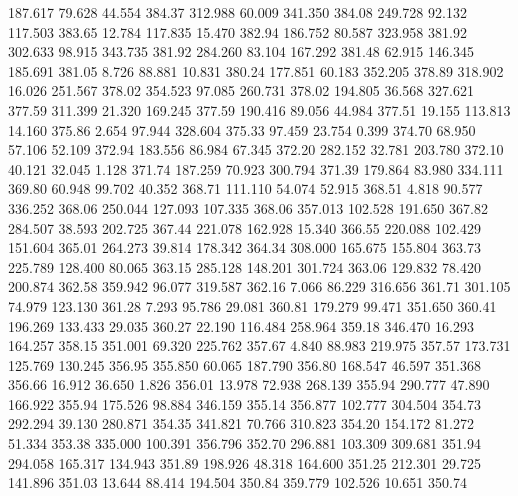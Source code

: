  187.617   79.628   44.554       384.37
 312.988   60.009  341.350       384.08
 249.728   92.132  117.503       383.65
  12.784  117.835   15.470       382.94
 186.752   80.587  323.958       381.92
 302.633   98.915  343.735       381.92
 284.260   83.104  167.292       381.48
  62.915  146.345  185.691       381.05
   8.726   88.881   10.831       380.24
 177.851   60.183  352.205       378.89
 318.902   16.026  251.567       378.02
 354.523   97.085  260.731       378.02
 194.805   36.568  327.621       377.59
 311.399   21.320  169.245       377.59
 190.416   89.056   44.984       377.51
  19.155  113.813   14.160       375.86
   2.654   97.944  328.604       375.33
  97.459   23.754    0.399       374.70
  68.950   57.106   52.109       372.94
 183.556   86.984   67.345       372.20
 282.152   32.781  203.780       372.10
  40.121   32.045    1.128       371.74
 187.259   70.923  300.794       371.39
 179.864   83.980  334.111       369.80
  60.948   99.702   40.352       368.71
 111.110   54.074   52.915       368.51
   4.818   90.577  336.252       368.06
 250.044  127.093  107.335       368.06
 357.013  102.528  191.650       367.82
 284.507   38.593  202.725       367.44
 221.078  162.928   15.340       366.55
 220.088  102.429  151.604       365.01
 264.273   39.814  178.342       364.34
 308.000  165.675  155.804       363.73
 225.789  128.400   80.065       363.15
 285.128  148.201  301.724       363.06
 129.832   78.420  200.874       362.58
 359.942   96.077  319.587       362.16
   7.066   86.229  316.656       361.71
 301.105   74.979  123.130       361.28
   7.293   95.786   29.081       360.81
 179.279   99.471  351.650       360.41
 196.269  133.433   29.035       360.27
  22.190  116.484  258.964       359.18
 346.470   16.293  164.257       358.15
 351.001   69.320  225.762       357.67
   4.840   88.983  219.975       357.57
 173.731  125.769  130.245       356.95
 355.850   60.065  187.790       356.80
 168.547   46.597  351.368       356.66
  16.912   36.650    1.826       356.01
  13.978   72.938  268.139       355.94
 290.777   47.890  166.922       355.94
 175.526   98.884  346.159       355.14
 356.877  102.777  304.504       354.73
 292.294   39.130  280.871       354.35
 341.821   70.766  310.823       354.20
 154.172   81.272   51.334       353.38
 335.000  100.391  356.796       352.70
 296.881  103.309  309.681       351.94
 294.058  165.317  134.943       351.89
 198.926   48.318  164.600       351.25
 212.301   29.725  141.896       351.03
  13.644   88.414  194.504       350.84
 359.779  102.526   10.651       350.74
